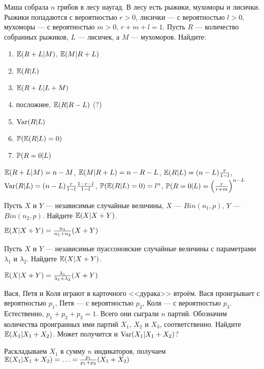 \begin{solution}
\begin{solution}
\begin{solution}
\begin{solution}
\begin{solution}
\begin{solution}
\begin{solution}
\begin{problem}
Маша собрала $n$ грибов в лесу наугад. В лесу есть рыжики, мухоморы и лисички. Рыжики попадаются с вероятностью $r>0$, лисички --- с вероятностью $l>0$,  мухоморы --- с вероятностью $m>0$, $r+m+l=1$. Пусть $R$ --- количество собранных рыжиков, $L$ --- лисичек, а $M$ --- мухоморов. Найдите:
\begin{enumerate}
\item $\E(R+L|M)$, $\E(M|R+L)$
\item $\E(R|L)$
\item $\E(R+L|L+M)$
\item посложнее, $\E(R|R-L)$ (?)
\item $\Var(R|L)$
\item $\P(\E(R|L)=0)$
\item $\P(R=0 | L)$
\end{enumerate}
\end{problem} 
\begin{solution} 
$\E(R+L|M)=n-M$, $\E(M|R+L)=n-R-L$, $\E(R|L)=(n-L)\frac{r}{1-l}$, $\Var(R|L)=(n-L)\frac{r}{1-l}\frac{1-r-l}{1-l}$, $\P(\E(R|L)=0)=l^{n}$, $\P(R=0 | L)=\left(\frac{r}{r+m}\right)^{n-L}$
\end{solution}

\begin{problem}
 Пусть $X$ и $Y$ --- независимые случайные величины, $X$ --- $Bin(n_{1},p)$, $Y$ --- $Bin(n_{2},p)$. Найдите $\E(X|X+Y)$.
\end{problem} 
\begin{solution} 
$\E(X|X+Y)=\frac{n_{1}}{n_{1}+n_{2}}(X+Y)$
\end{solution}

\begin{problem}
 Пусть $X$ и $Y$ --- независимые пуассоновские случайные величины с параметрами $\lambda_{1}$ и $\lambda_{2}$. Найдите $\E(X|X+Y)$.
\end{problem} 
\begin{solution} 
$\E(X|X+Y)=\frac{\lambda_{1}}{\lambda_{1}+\lambda_{2}}(X+Y)$
\end{solution}

\begin{problem}
Вася, Петя и Коля играют в карточного <<дурака>> втроём. Вася проигрывает с вероятностью $p_1$, Петя --- с вероятностью $p_2$, Коля --- с вероятностью $p_3$. Естественно, $p_1+p_2+p_3=1$. Всего они сыграли $n$ партий. Обозначим количества проигранных ими партий $X_1$, $X_2$ и $X_3$, соответственно. Найдите $\E(X_1|X_1+X_2)$. Может получится и $\Var(X_1|X_1+X_2)$?
\end{problem} 
\begin{solution} 
Раскладываем $X_1$ в сумму $n$ индикаторов, получаем $\E(X_1|X_1+X_2)=\ldots=\frac{p_1}{p_1+p_2}(X_1+X_2)$
\end{solution}


\end{solution}
\end{solution}
\end{solution}
\end{solution}
\end{solution}
\end{solution}
\end{solution}

